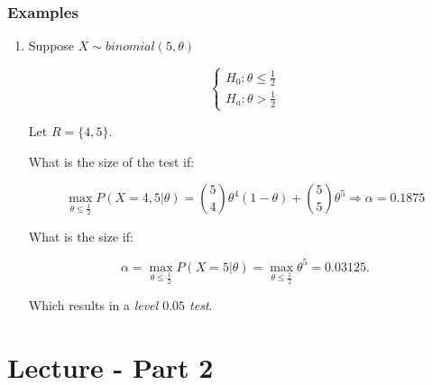 \documentclass{article}
\begin{document}
    \subsubsection{Examples}
    \begin{enumerate}
        \item Suppose $X\sim binomial(5,\theta)$
        
        \begin{equation*}
            \begin{cases}
                H_0: \theta \leq \frac{1}{2}\\
                H_a: \theta > \frac{1}{2}
            \end{cases}
        \end{equation*}
        
        Let $R = \{4,5 \}$. 
        
        What is the size of the test if:
        
        \begin{equation*}
            \max_{\theta \leq \frac{1}{2}} P (X = 4,5|\theta) = \binom{5}{4} \theta^4 (1-\theta) + \binom{5}{5}\theta^5 \Rightarrow \alpha = 0.1875
        \end{equation*}
        
        What is the size if:
        
        \begin{equation*}
            \alpha = \max_{\theta \leq \frac{1}{2}} P(X=5 | \theta) = \max_{\theta \leq \frac{1}{2}} \theta^5 = 0.03125.
        \end{equation*}
        
        Which results in a \textit{level $0.05$ test}.
        
    \end{enumerate}
        \section{Lecture - Part 2}
        
\end{document}
